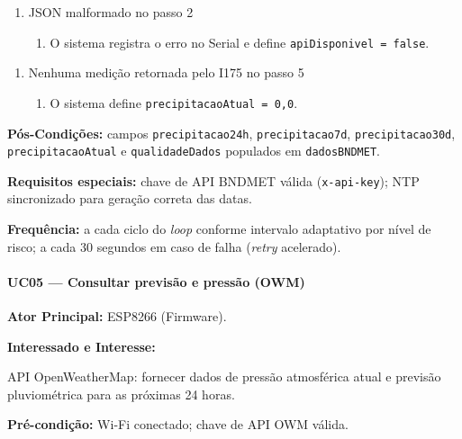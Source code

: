 \begin{enumerate}
  \renewcommand{\theenumi}{2b}
  \renewcommand{\labelenumi}{\theenumi.}
  \item JSON malformado no passo 2
  \begin{enumerate}
  \item O sistema registra o erro no Serial e define
        \texttt{apiDisponivel = false}.
  \end{enumerate}
\end{enumerate}

\begin{enumerate}
  \renewcommand{\theenumi}{5a}
  \renewcommand{\labelenumi}{\theenumi.}
  \item Nenhuma medição retornada pelo I175 no passo 5
  \begin{enumerate}
  \item O sistema define \texttt{precipitacaoAtual = 0{,}0}.
  \end{enumerate}
\end{enumerate}

\textbf{Pós-Condições:} campos \texttt{precipitacao24h},
\texttt{precipitacao7d}, \texttt{precipitacao30d},
\texttt{precipitacaoAtual} e \texttt{qualidadeDados} populados
em \texttt{dadosBNDMET}.

\textbf{Requisitos especiais:} chave de API BNDMET válida
(\texttt{x-api-key}); NTP sincronizado para geração correta
das datas.

\textbf{Frequência:} a cada ciclo do \textit{loop} conforme
intervalo adaptativo por nível de risco; a cada 30 segundos
em caso de falha (\textit{retry} acelerado).

\paragraph{UC05 --- Consultar previsão e pressão (OWM)}\hfill\break

\textbf{Ator Principal:} ESP8266 (Firmware).

\textbf{Interessado e Interesse:}

API OpenWeatherMap: fornecer dados de pressão atmosférica atual
e previsão pluviométrica para as próximas 24 horas.

\textbf{Pré-condição:} Wi-Fi conectado; chave de API OWM válida.


